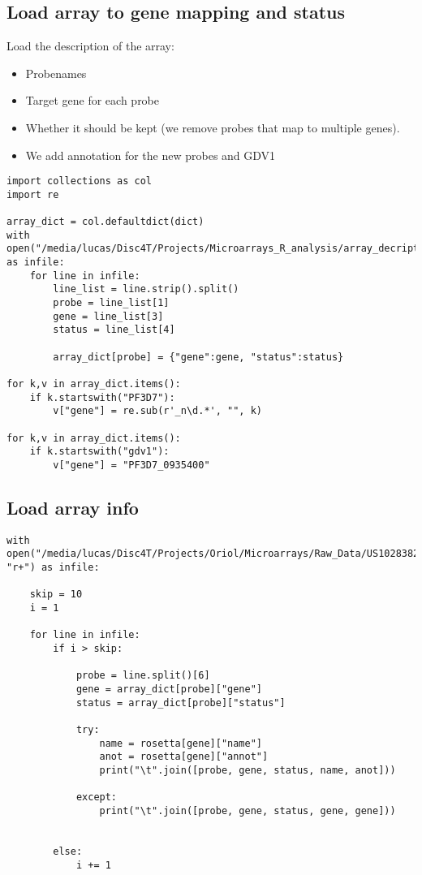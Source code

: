 \documentclass[11pt]{article}
\begin{document}
\subsection{Load array to gene mapping and status}
\label{sec:orgbf8bfab}
Load the description of the array:
\begin{itemize}
\item Probenames
\item Target gene for each probe
\item Whether it should be kept (we remove probes that map to multiple genes).
\item We add annotation for the new probes and GDV1
\end{itemize}

\begin{verbatim}
import collections as col
import re

array_dict = col.defaultdict(dict)
with open("/media/lucas/Disc4T/Projects/Microarrays_R_analysis/array_decription.csv") as infile:
    for line in infile:
        line_list = line.strip().split()
        probe = line_list[1]
        gene = line_list[3]
        status = line_list[4]

        array_dict[probe] = {"gene":gene, "status":status}

for k,v in array_dict.items():
    if k.startswith("PF3D7"):
        v["gene"] = re.sub(r'_n\d.*', "", k)

for k,v in array_dict.items():
    if k.startswith("gdv1"):
        v["gene"] = "PF3D7_0935400"
\end{verbatim}

\subsection{Load array info}
\label{sec:orga7c4747}
\begin{verbatim}
with open("/media/lucas/Disc4T/Projects/Oriol/Microarrays/Raw_Data/US10283823_258576310003_S01_GE2_1105_Oct12_1_1.txt", "r+") as infile:

    skip = 10
    i = 1

    for line in infile:
        if i > skip:

            probe = line.split()[6]
            gene = array_dict[probe]["gene"]
            status = array_dict[probe]["status"]

            try:
                name = rosetta[gene]["name"]
                anot = rosetta[gene]["annot"]
                print("\t".join([probe, gene, status, name, anot]))

            except:
                print("\t".join([probe, gene, status, gene, gene]))


        else:
            i += 1
\end{verbatim}
\end{document}
